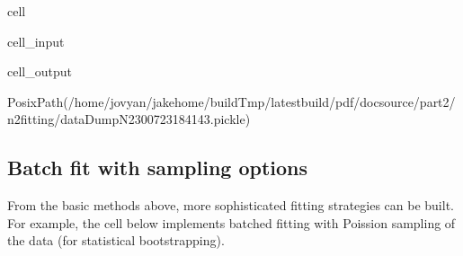 \documentclass[letterpaper,table,10pt,english]{jupyterBook}
\begin{document}
\begin{sphinxuseclass}{cell}\begin{sphinxVerbatimInput}

\begin{sphinxuseclass}{cell_input}
\begin{sphinxVerbatim}[commandchars=\\\{\}]
    


     
\end{sphinxVerbatim}

\end{sphinxuseclass}\end{sphinxVerbatimInput}
\begin{sphinxVerbatimOutput}

\begin{sphinxuseclass}{cell_output}
\begin{sphinxVerbatim}[commandchars=\\\{\}]
PosixPath(\PYGZsq{}/home/jovyan/jake\PYGZhy{}home/buildTmp/\PYGZus{}latest\PYGZus{}build/pdf/doc\PYGZhy{}source/part2/n2fitting/dataDump\PYGZus{}N2\PYGZus{}300723\PYGZus{}18\PYGZhy{}41\PYGZhy{}43.pickle\PYGZsq{})
\end{sphinxVerbatim}

\end{sphinxuseclass}\end{sphinxVerbatimOutput}

\end{sphinxuseclass}

\subsection{Batch fit with sampling options}
\label{\detokenize{part2/basic_fitting_numerics_intro_260723:batch-fit-with-sampling-options}}
\sphinxAtStartPar
From the basic methods above, more sophisticated fitting strategies can be built. For example, the cell below implements batched fitting with Poission sampling of the data (for statistical bootstrapping).
\end{document}
